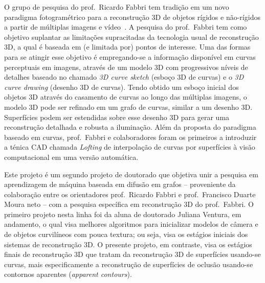 \documentclass[a4paper,titlepage]{article}
\begin{document}
O grupo de pesquisa do prof.\ Ricardo Fabbri tem tradição em um novo paradigma
fotogramétrico para a reconstrução 3D de objetos rígidos e não-rígidos a partir
de múltiplas imagens e
vídeo~\cite{Fabbri:Kimia:IJCV2016,Fabbri:PhD:2010,Fabbri:Giblin:Kimia:ECCV12,Fabbri:Kimia:EMMCVPR2005,Fabbri:Kimia:CVPR10,Usumezbas:Fabbri:Kimia:CVPR:2017,Usumezbas:Fabbri:Kimia:ECCV16}.
A pesquisa do prof.\ Fabbri tem como objetivo suplantar as limitações
supracitadas da tecnologia usual de reconstrução 3D, a qual é baseada em (e
limitada por) pontos de interesse. Uma das formas para se atingir esse objetivo
é empregando-se a informação disponível em curvas perceptuais em imagens,
através de um modelo 3D com progressivos níveis de detalhes baseado no chamado
\emph{3D curve sketch} (esboço 3D de curvas) e o \emph{3D curve drawing}
(desenho 3D de curvas). Tendo obtido um esboço inicial dos objetos 3D através do
casamento de curvas ao longo das múltiplas imagens, o modelo 3D pode ser
refinado em um grafo de curvas, similar a um desenho 3D. Superfícies podem ser
estendidas sobre esse desenho 3D para gerar uma reconstrução detalhada e
robusta a iluminação. Além da proposta do paradigma baseado em curvas, prof.\
Fabbri e colaboradores foram os primeiros a introduzir a ténica
CAD chamada \emph{Lofting} de interpolação de curvas por superfícies à visão
computacional em uma versão automática.

Este projeto é um segundo projeto de doutorado que objetiva unir a pesquisa em
aprendizagem de máquina baseada em difusão em grafos -- proveniente da
colaboração entre os orientadores prof.\ Ricardo Fabbri e prof.\ Francisco
Duarte Moura neto --  com a pesquisa específica em reconstrução 3D do prof.\
Fabbri. O primeiro projeto nesta linha foi da aluna de doutorado Juliana
Ventura, em andamento, o qual visa melhores algoritmos para inicializar modelos
de câmera e de objetos curvilíneos com pouca textura; ou seja, visa os estágios
iniciais dos sistemas de reconstrução 3D. O presente projeto, em
contraste, visa os estágios finais de reconstrução 3D que tratam da reconstrução
3D de superfícies usando-se curvas, mais especificamente a reconstrução de
superfícies de oclusão usando-se contornos aparentes (\emph{apparent contours}).

\end{document}

